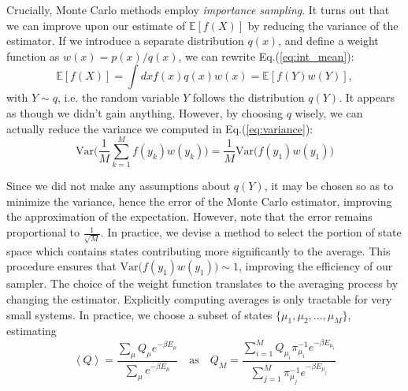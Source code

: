 Crucially, Monte Carlo methods employ \emph{importance sampling}.
It turns out that we can improve upon our estimate of $\mathbb{E} [f(X)]$ by reducing the variance of the estimator. If we introduce a separate distribution $q(x)$, and define a weight function as $w(x) = p(x)/ q(x)$, we can rewrite Eq.(\ref{eq:int_mean}):
\begin{equation}
\mathbb{E} [f(X)] = \int dx f(x) q(x) w(x) = \mathbb{E} [f(Y) w(Y)],
\end{equation}
with $Y \sim q$, i.e. the random variable $Y$ follows the distribution $q(Y)$.
It appears as though we didn't gain anything. However, by choosing $q$ wisely, we can actually reduce the variance we computed in Eq.(\ref{eq:variance}):
\begin{equation}
\text{Var}\bigg( \frac{1}{M} \sum_{k=1}^M f(y_k) w(y_k) \bigg) = \frac{1}{M} \text{Var}\bigg( f(y_1) w(y_1) \bigg)
\end{equation}

Since we did not make any assumptions about $q(Y)$, it may be chosen so as to minimize the variance, hence the error of the Monte Carlo estimator, improving the approximation of the expectation. However, note that the error remains proportional to $\frac{1}{\sqrt{M}}$.
In practice, we devise a method to select the portion of state space which contains states contributing more significantly to the average.
This procedure ensures that $\text{Var}\big( f(y_1) w(y_1) \big) \sim 1$, improving the efficiency of our sampler.
The choice of the weight function translates to the averaging process by changing the estimator.
Explicitly computing averages is only tractable for very small systems.
In practice, we choose a subset of states $\{\mu_1, \mu_2, ..., \mu_M \} $, estimating
\begin{equation}
\left\langle Q \right\rangle = \frac{ \sum_\mu Q_\mu e^{-\beta E_\mu} }{ \sum_\mu e^{-\beta E_\mu}} \quad \text{as} \quad
Q_M = \frac{ \sum_{i=1}^M Q_{\mu_i} \pi_{\mu_i}^{-1} e^{ -\beta E_{\mu_i} } }{ \sum_{j=1}^M \pi_{\mu_j}^{-1} e^{ -\beta E_{\mu_j} }  }
\end{equation}

